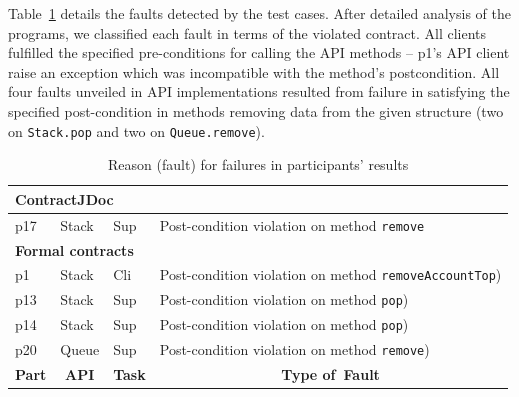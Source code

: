 Table~\ref{tab:faults} details the faults detected by the test cases. After detailed analysis of the programs, we classified each fault in terms of the violated contract. 
All clients fulfilled the specified pre-conditions for calling the API methods -- p1's API client raise an exception which was incompatible with the method's postcondition.
All four faults unveiled in API implementations resulted from failure in satisfying the specified post-condition in methods removing data from the given structure (two on \texttt{Stack.pop} and two on \texttt{Queue.remove}).

\begin{table}
\centering
\caption{Reason (fault) for failures in participants' results}
\label{tab:faults}
\begin{adjustbox}{width=\textwidth}
\begin{tabular}{|l|l|l|l|} 
\hline
\multicolumn{4}{|l|}{\textbf{ContractJDoc }}                                                                                                                                                                    \\ 
\hline
p17                                        & Stack                             & Sup                                & Post-condition violation on method \texttt{remove}                                    \\ 
\hline
\multicolumn{4}{|l|}{\textbf{Formal contracts} }                                                                                                                                                                \\ 
\hline
p1                                         & Stack                             & Cli                                & Post-condition violation on method \texttt{removeAccountTop})    \\ 
\hline
p13                                        & Stack                             & Sup                                & Post-condition violation on method \texttt{pop})     \\ 
\hline
p14                                        & Stack                             & Sup                                & Post-condition violation on method \texttt{pop})     \\ 
\hline
p20                                        & Queue                             & Sup                                & Post-condition violation on method \texttt{remove})  \\ 
\hline\hline
\multicolumn{1}{|c|}{\textbf{Part}} & \multicolumn{1}{c|}{\textbf{API}} & \multicolumn{1}{c|}{\textbf{Task}} & \multicolumn{1}{c|}{\textbf{Type of~Fault}}                                               \\
\hline
\end{tabular}
\end{adjustbox}
\end{table}

